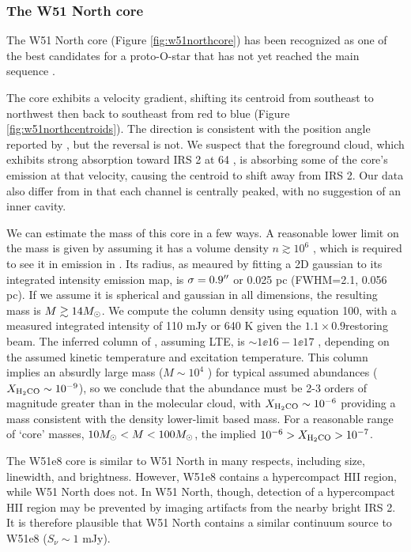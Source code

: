 \subsubsection{The W51 North core}
\label{sec:northcore}
The W51 North core (Figure \ref{fig:w51northcore}) has been recognized as one
of the best candidates for a proto-O-star that has not yet reached the main
sequence \citep{Zapata2009a,Zapata2010a,Goddi2015a}.  

The core exhibits a velocity gradient, shifting its centroid from southeast to
northwest then back to southeast from red to blue (Figure
\ref{fig:w51northcentroids}).  The direction is consistent
with the position angle reported by \citet{Zapata2010a}, but the reversal is
not.  We suspect that the foreground cloud, which exhibits strong absorption
toward IRS 2 at 64 \kms, is absorbing some of the core's emission at that
velocity, causing the centroid to shift away from IRS 2.  Our data also differ
from \citet{Zapata2010a} in that each channel is centrally peaked, with no
suggestion of an inner cavity.

We can estimate the mass of this core in a few ways.  A reasonable lower limit
on the mass is given by assuming it has a volume density $n\gtrsim10^6$ \percc,
which is required to see it in emission in \ortho \twotwo.  Its radius, as
meaured by fitting a 2D gaussian to its integrated intensity emission map, is
$\sigma=0.9\mbox{$^{\prime\prime}$}$ or 0.025 pc (FWHM=2.1\arcsec, 0.056 pc).  If we assume it
is spherical and gaussian in
all dimensions, the resulting mass is $M\gtrsim14M_{\odot}$.
We compute the \ortho \twotwo column density using \citet{Mangum2015a} equation
100, with a measured integrated intensity of 110 mJy \kms or 640 K \kms given
the $1.1\times0.9$\arcsec restoring beam.  The inferred column of \ortho,
assuming LTE, is $\sim1\ee{16} - 1\ee{17}$ \persc, depending on the assumed
kinetic temperature and excitation temperature.  This \formaldehyde column
implies an absurdly large mass ($M\sim10^4$ \msun) for typical assumed abundances
($X_{\textrm{H}_2\textrm{CO}}\sim10^{-9}$), so we conclude that the \formaldehyde abundance
must be 2-3 orders of magnitude greater than in the molecular cloud, with
$X_{\textrm{H}_2\textrm{CO}}\sim10^{-6}$ providing a mass consistent with the density
lower-limit based mass.  For a reasonable range of `core' masses, $10
M_{\odot}<M<100 M_{\odot}$, the implied $10^{-6} > X_{\textrm{H}_2\textrm{CO}} > 10^{-7}$.

The W51e8 core is similar to W51 North in many respects, including size,
linewidth, and brightness.  However, W51e8 contains a hypercompact HII region,
while W51 North does not.  In W51 North, though, detection of a hypercompact
HII region may be prevented by imaging artifacts from the nearby bright IRS 2.
It is therefore plausible that W51 North contains a similar continuum source to
W51e8 ($S_\nu \sim 1$ mJy).

